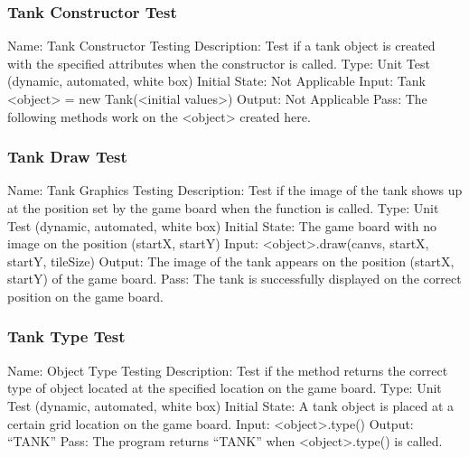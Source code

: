\documentclass{article}
\begin{document}
\subsubsection{Tank Constructor Test}
Name: Tank Constructor Testing\newline
Description: Test if a tank object is created with the specified attributes when the constructor is called.\newline
Type: Unit Test (dynamic, automated, white box)\newline
Initial State: Not Applicable\newline
Input: Tank <object> = new Tank(<initial values>)\newline
Output: Not Applicable \newline
Pass: The following methods work on the <object> created here.\newline

\subsubsection{Tank Draw Test}
Name: Tank Graphics Testing\newline
Description: Test if the image of the tank shows up at the position set by the game board when the function is called.\newline
Type: Unit Test (dynamic, automated, white box)\newline
Initial State: The game board with no image on the position (startX, startY)\newline
Input: <object>.draw(canvs, startX, startY, tileSize)\newline
Output: The image of the tank appears on the position (startX, startY) of the game board.\newline
Pass: The tank is successfully displayed on the correct position on the game board.\newline

\subsubsection{Tank Type Test}
Name: Object Type Testing\newline
Description: Test if the method returns the correct type of object located at the specified location on the game board\newline.
Type: Unit Test (dynamic, automated, white box)\newline
Initial State: A tank object is placed at a certain grid location on the game board.\newline
Input: <object>.type()\newline
Output: “TANK”\newline
Pass: The program returns “TANK” when <object>.type() is called.\newline
\end{document}
